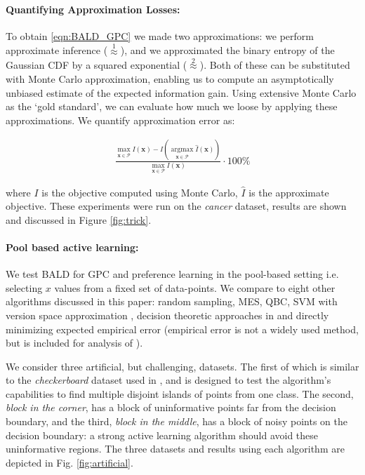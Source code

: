 \documentclass{article}
\newcommand{\x}{\bm{x}}
\newcommand{\argmax}{ \operatorname*{arg \max}}
\newcommand{\ourmethod}{BALD } %
\begin{document}
\paragraph{Quantifying Approximation Losses:} To obtain \eqref{eqn:BALD_GPC} we made two approximations: we perform approximate inference ({\scriptsize $\stackrel{1}{\approx}$}), and we approximated the binary entropy of the Gaussian CDF by a squared exponential ({\scriptsize $\stackrel{2}{\approx}$}). Both of these can be substituted with Monte Carlo approximation, enabling us to compute an asymptotically unbiased estimate of the expected information gain. Using extensive Monte Carlo as the `gold standard', we can evaluate how much we loose by applying these approximations. We quantify approximation error as: 

\begin{align}
\frac{ \max_{\x\in\mathcal{P}} I(\x) - I(\argmax_{\x\in\mathcal{P}}\hat{I}(\x)) }{{\max_{\x\in\mathcal{P}}I(\x) }}\cdot 100\% 
\end{align}

where $I$ is the objective computed using Monte Carlo, $\hat{I}$ is the approximate objective. These experiments were run on the \emph{cancer} dataset, results are shown and discussed in Figure \ref{fig:trick}.



\paragraph{Pool based active learning:} We test \ourmethod for GPC and preference learning in the pool-based setting i.e. selecting $x$ values from a fixed set of data-points. We compare to eight other algorithms discussed in this paper: random sampling, MES, QBC, SVM with version space approximation \cite{tong2001}, decision theoretic approaches in \cite{kapoor2007, zhu2003} and directly minimizing expected empirical error (empirical error is not a widely used method, but is included for analysis of \cite{kapoor2007}).

We consider three artificial, but challenging, datasets. The first of which is similar to the \emph{checkerboard} dataset used in \cite{zhu2003}, and is designed to test the algorithm's capabilities to find multiple disjoint islands of points from one class. The second, \emph{block in the corner}, has a block of uninformative points far from the decision boundary, and the third, \emph{block in the middle}, has a block of noisy points on the decision boundary: a strong active learning algorithm should avoid these uninformative regions. The three datasets and results using each algorithm are depicted in Fig. \ref{fig:artificial}.
\end{document}
